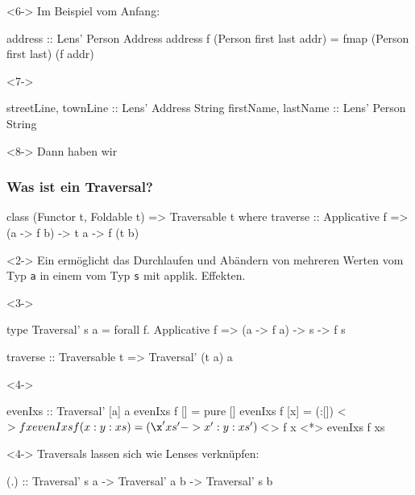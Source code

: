 \documentclass{beamer}
\begin{document}
\begin{frame}[fragile]
  \begin{visibleenv}<6->
    Im Beispiel vom Anfang:
\begin{haskellcode}
address :: Lens' Person Address
address f (Person first last addr) =
  fmap (Person first last) (f addr)
\end{haskellcode}
  \end{visibleenv}
  \begin{visibleenv}<7->
\begin{haskellcode}
streetLine, townLine :: Lens' Address String
firstName,  lastName :: Lens' Person String
\end{haskellcode}
  \end{visibleenv}
  \begin{visibleenv}<8->
    Dann haben wir \enspace
  \end{visibleenv}
\end{frame}

\begin{frame}[fragile,t]
  \frametitle{Was ist ein Traversal?}
\begin{haskellcode}
class (Functor t, Foldable t) => Traversable t where
  traverse :: Applicative f => (a -> f b) -> t a -> f (t b)
\end{haskellcode}
  \begin{onlyenv}<2->
    {\normalsize Ein  ermöglicht das Durchlaufen und Abändern von mehreren Werten vom Typ \verb|a| in einem vom Typ \verb|s| mit applik. Effekten.}
  \end{onlyenv}
  \begin{onlyenv}<3->
\begin{haskellcode}
type Traversal' s a = forall f.
  Applicative f => (a -> f a) -> s -> f s
\end{haskellcode}
\begin{haskellcode}
traverse :: Traversable t => Traversal' (t a) a
\end{haskellcode}
  \end{onlyenv}
  \begin{onlyenv}<4->
\begin{haskellcode}
evenIxs :: Traversal' [a] a
evenIxs f [] = pure []
evenIxs f [x] = (:[]) <$> f x
evenIxs f (x:y:xs) = (\x' xs' -> x':y:xs')
                     <$> f x <*> evenIxs f xs
\end{haskellcode}
  \end{onlyenv}
  \begin{onlyenv}<4->
    Traversals lassen sich wie Lenses verknüpfen:
\begin{haskellcode}
(.) :: Traversal' s a -> Traversal' a b -> Traversal' s b
\end{haskellcode}
  \end{onlyenv}
\end{frame}
\end{document}

